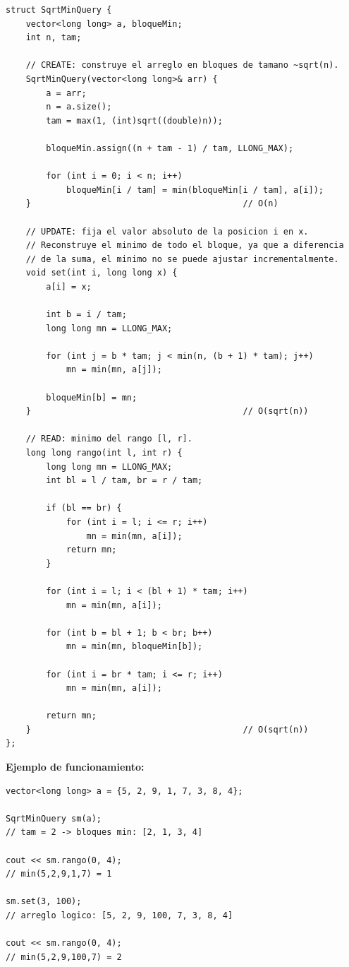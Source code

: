 \documentclass[10pt,a4paper,twocolumn]{article}
\begin{document}
\begin{lstlisting}[style=cpp]
struct SqrtMinQuery {
    vector<long long> a, bloqueMin;
    int n, tam;

    // CREATE: construye el arreglo en bloques de tamano ~sqrt(n).
    SqrtMinQuery(vector<long long>& arr) {
        a = arr;
        n = a.size();
        tam = max(1, (int)sqrt((double)n));

        bloqueMin.assign((n + tam - 1) / tam, LLONG_MAX);

        for (int i = 0; i < n; i++)
            bloqueMin[i / tam] = min(bloqueMin[i / tam], a[i]);
    }                                          // O(n)

    // UPDATE: fija el valor absoluto de la posicion i en x.
    // Reconstruye el minimo de todo el bloque, ya que a diferencia
    // de la suma, el minimo no se puede ajustar incrementalmente.
    void set(int i, long long x) {
        a[i] = x;

        int b = i / tam;
        long long mn = LLONG_MAX;

        for (int j = b * tam; j < min(n, (b + 1) * tam); j++)
            mn = min(mn, a[j]);

        bloqueMin[b] = mn;
    }                                          // O(sqrt(n))

    // READ: minimo del rango [l, r].
    long long rango(int l, int r) {
        long long mn = LLONG_MAX;
        int bl = l / tam, br = r / tam;

        if (bl == br) {
            for (int i = l; i <= r; i++)
                mn = min(mn, a[i]);
            return mn;
        }

        for (int i = l; i < (bl + 1) * tam; i++)
            mn = min(mn, a[i]);

        for (int b = bl + 1; b < br; b++)
            mn = min(mn, bloqueMin[b]);

        for (int i = br * tam; i <= r; i++)
            mn = min(mn, a[i]);

        return mn;
    }                                          // O(sqrt(n))
};
\end{lstlisting}

\textbf{Ejemplo de funcionamiento:}

\begin{lstlisting}[style=cpp]
vector<long long> a = {5, 2, 9, 1, 7, 3, 8, 4};

SqrtMinQuery sm(a);
// tam = 2 -> bloques min: [2, 1, 3, 4]

cout << sm.rango(0, 4);
// min(5,2,9,1,7) = 1

sm.set(3, 100);
// arreglo logico: [5, 2, 9, 100, 7, 3, 8, 4]

cout << sm.rango(0, 4);
// min(5,2,9,100,7) = 2
\end{lstlisting}
\end{document}
